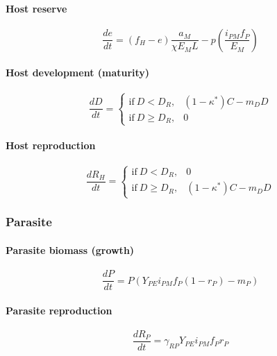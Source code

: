 \documentclass[10,portrait]{article}
\let\oldparagraph\paragraph
\renewcommand{\paragraph}[1]{\oldparagraph{#1}\mbox{}}
\begin{document}
\paragraph{Host reserve}\label{host-reserve}

\[
  \frac 
    {d e}
    {d t}
    = (f_{H} - e)
    \frac
      {a_{M}}
      {\chi E_{M}L} - p
        \left(
        \frac 
        {i_{PM}f_{P}}
        {E_{M}}
        \right)
\]

\paragraph{Host development (maturity)}\label{host-development-maturity}

\[
  \frac
  {d D}
  {d t}
  = \begin{cases}
      \text{if} \ D < D_{R}, & (1 - \kappa^{*})C - m_{D}D \\
      \text{if} \ D ≥ D_{R}, & 0
    \end{cases}
\]

\paragraph{Host reproduction}\label{host-reproduction}

\[
  \frac
  {d R_{H}}
  {d t}
  = \begin{cases}
      \text{if} \ D < D_{R}, & 0 \\
      \text{if} \ D ≥ D_{R}, & (1 - \kappa^{*})C - m_{D}D
    \end{cases}
\]

\subsubsection{Parasite}\label{parasite}

\paragraph{Parasite biomass (growth)}\label{parasite-biomass-growth}

\[
  \frac
  {d P}
  {d t}
  = P(Y_{PE}i_{PM}f_{P} (1-r_{P}) -m_{P})
\]

\paragraph{Parasite reproduction}\label{parasite-reproduction}

\[
  \frac
  {d R_{P}}
  {d t}
  = \gamma_{RP}Y_{PE}i_{PM}f_{P}r_{P}
\]
\end{document}
